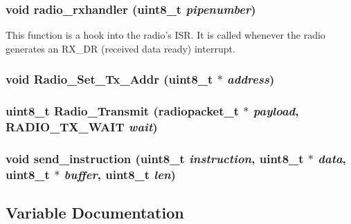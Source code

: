 \subsubsection{\setlength{\rightskip}{0pt plus 5cm}void radio\_\-rxhandler (uint8\_\-t {\em pipenumber})}\label{radio_8c_13b3742bf3c052776d9061ea792c8456}


This function is a hook into the radio's ISR. It is called whenever the radio generates an RX\_\-DR (received data ready) interrupt. 
\subsubsection{\setlength{\rightskip}{0pt plus 5cm}void Radio\_\-Set\_\-Tx\_\-Addr (uint8\_\-t $\ast$ {\em address})}\label{radio_8c_4045908f305268e06f4ba367f6e82c8a}


\subsubsection{\setlength{\rightskip}{0pt plus 5cm}uint8\_\-t Radio\_\-Transmit ({\bf radiopacket\_\-t} $\ast$ {\em payload}, {\bf RADIO\_\-TX\_\-WAIT} {\em wait})}\label{radio_8c_144560ba7390873c38539f03423f8a3d}


\subsubsection{\setlength{\rightskip}{0pt plus 5cm}void send\_\-instruction (uint8\_\-t {\em instruction}, uint8\_\-t $\ast$ {\em data}, uint8\_\-t $\ast$ {\em buffer}, uint8\_\-t {\em len})}\label{radio_8c_82033ffab6e1c12a026bdb7f8258b5f3}




\subsection{Variable Documentation}
